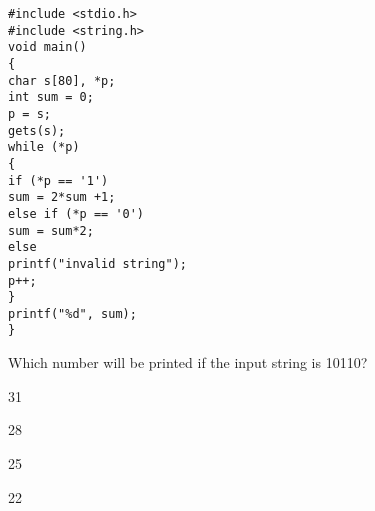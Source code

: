 \begin{lstlisting}
#include <stdio.h>
#include <string.h>
void main()
{
char s[80], *p;
int sum = 0;
p = s;
gets(s);
while (*p)
{
if (*p == '1')
sum = 2*sum +1;
else if (*p == '0')
sum = sum*2;
else
printf("invalid string");
p++;
}
printf("%d", sum);
}
\end{lstlisting}
Which number will be printed if the input string is 10110?
\begin{enumerate}
    \begin{multicols}{4}
        \item 31
        \item 28
        \item 25
        \item 22
    \end{multicols}
\end{enumerate}
\bigskip

